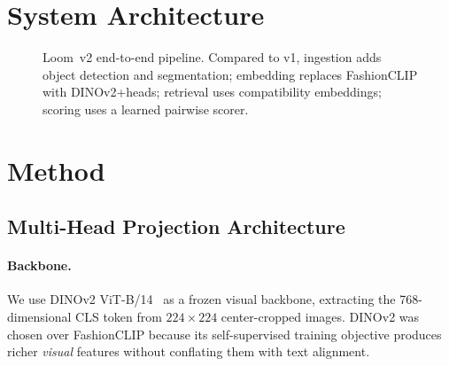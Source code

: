 \documentclass[10pt,twocolumn]{article}
\begin{document}
\section{System Architecture}
\label{sec:architecture}

\begin{figure}[t]
\centering
{}
\caption{Loom~v2 end-to-end pipeline.  Compared to v1, ingestion adds
object detection and segmentation; embedding replaces FashionCLIP with
DINOv2+heads; retrieval uses compatibility embeddings; scoring uses a
learned pairwise scorer.}
\label{fig:pipeline_v2}
\end{figure}

\section{Method}
\label{sec:method}

\subsection{Multi-Head Projection Architecture}
\label{sec:multihead}

\paragraph{Backbone.}
We use DINOv2 ViT-B/14~\citep{oquab2024dinov2} as a frozen visual
backbone, extracting the 768-dimensional CLS token from
$224 \times 224$ center-cropped images.  DINOv2 was chosen over FashionCLIP
because its self-supervised training objective produces richer
\emph{visual} features without conflating them with text alignment.
\end{document}
